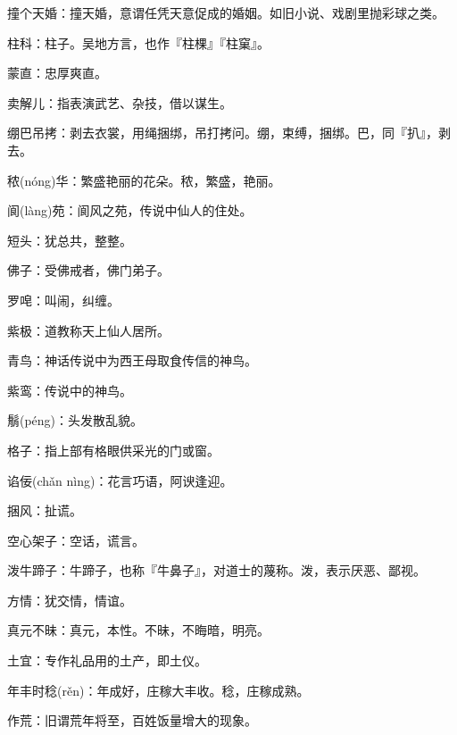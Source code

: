 \startbuffer[912]
撞个天婚：撞天婚，意谓任凭天意促成的婚姻。如旧小说、戏剧里抛彩球之类。
\stopbuffer


\startbuffer[913]
柱科：柱子。吴地方言，也作『柱棵』『柱窠』。
\stopbuffer


\startbuffer[914]
蒙直：忠厚爽直。
\stopbuffer


\startbuffer[915]
卖解儿：指表演武艺、杂技，借以谋生。
\stopbuffer


\startbuffer[916]
绷巴吊拷：剥去衣裳，用绳捆绑，吊打拷问。绷，束缚，捆绑。巴，同『扒』，剥去。
\stopbuffer


\startbuffer[917]
秾(nóng)华：繁盛艳丽的花朵。秾，繁盛，艳丽。
\stopbuffer


\startbuffer[918]
阆(làng)苑：阆风之苑，传说中仙人的住处。
\stopbuffer


\startbuffer[919]
短头：犹总共，整整。
\stopbuffer


\startbuffer[920]
佛子：受佛戒者，佛门弟子。
\stopbuffer


\startbuffer[921]
罗唣：叫闹，纠缠。
\stopbuffer


\startbuffer[922]
紫极：道教称天上仙人居所。
\stopbuffer


\startbuffer[923]
青鸟：神话传说中为西王母取食传信的神鸟。
\stopbuffer


\startbuffer[924]
紫鸾：传说中的神鸟。
\stopbuffer


\startbuffer[925]
鬅(péng)：头发散乱貌。
\stopbuffer


\startbuffer[926]
格子：指上部有格眼供采光的门或窗。
\stopbuffer


\startbuffer[927]
谄佞(chǎn nìng)：花言巧语，阿谀逢迎。
\stopbuffer


\startbuffer[928]
捆风：扯谎。
\stopbuffer


\startbuffer[929]
空心架子：空话，谎言。
\stopbuffer


\startbuffer[930]
泼牛蹄子：牛蹄子，也称『牛鼻子』，对道士的蔑称。泼，表示厌恶、鄙视。
\stopbuffer


\startbuffer[931]
方情：犹交情，情谊。
\stopbuffer


\startbuffer[932]
真元不昧：真元，本性。不昧，不晦暗，明亮。
\stopbuffer


\startbuffer[933]
土宜：专作礼品用的土产，即土仪。
\stopbuffer


\startbuffer[934]
年丰时稔(rěn)：年成好，庄稼大丰收。稔，庄稼成熟。
\stopbuffer


\startbuffer[935]
作荒：旧谓荒年将至，百姓饭量增大的现象。
\stopbuffer


